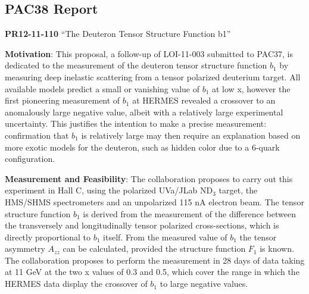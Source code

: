 \subsection*{PAC38 Report}
{
\noindent
{\bf PR12-11-110} ``The Deuteron Tensor Structure Function b1''

\vspace{0.1cm}
\noindent
{\bf Motivation}: This proposal, a follow-up of LOI-11-003 submitted to PAC37, is dedicated to the measurement of the deuteron tensor structure function $b_1$ by measuring deep inelastic scattering from a tensor polarized deuterium target. All available models predict a small or vanishing value of $b_1$ at low x, however the first pioneering measurement of $b_1$ at HERMES revealed a crossover to an anomalously large negative value, albeit with a relatively large experimental uncertainty. This justifies the intention to make a precise measurement: confirmation that $b_1$ is relatively large may then require an explanation based on more exotic models for the deuteron, such as hidden color due to a 6-quark configuration.

\noindent
{\bf Measurement and Feasibility}: The collaboration proposes to carry out this experiment in Hall C, using the polarized UVa/JLab ND$_3$ target, the HMS/SHMS spectrometers and an unpolarized 115 nA electron beam. The tensor structure function $b_1$ is derived from the measurement of the difference between the transversely and longitudinally tensor polarized cross-sections, which is directly proportional to $b_1$ itself. From the measured value of $b_1$ the tensor asymmetry $A_{zz}$ can be calculated, provided the structure function $F_1$ is known. The collaboration proposes to perform the measurement in 28 days of data taking at 11 GeV at the two x values of 0.3 and 0.5, which cover the range in which the HERMES data display the crossover of $b_1$ to large negative values.



}
